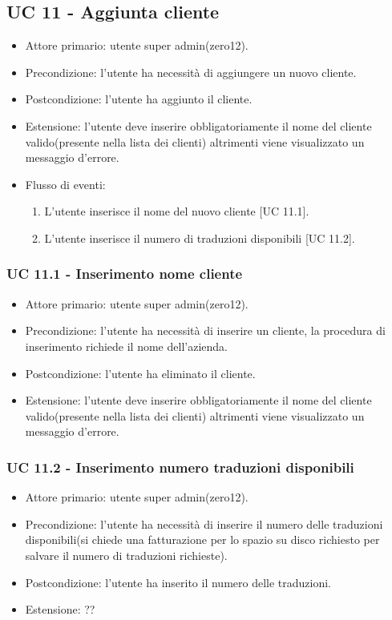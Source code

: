 \subsection*{UC 11 - Aggiunta cliente}
    \begin{itemize}
        \item Attore primario: utente super admin(zero12).
        \item Precondizione: l'utente ha necessità di aggiungere un nuovo cliente.
        \item Postcondizione: l'utente ha aggiunto il cliente.
        \item Estensione: l'utente deve inserire obbligatoriamente il nome del cliente valido(presente nella lista dei clienti) altrimenti viene visualizzato un messaggio d'errore.
        \item Flusso di eventi:
        \begin{enumerate}
            \item L'utente inserisce il nome del nuovo cliente [UC 11.1].
            \item L'utente inserisce il numero di traduzioni disponibili [UC 11.2].
        \end{enumerate}
    \end{itemize}
    \subsubsection*{UC 11.1 - Inserimento nome cliente}
        \begin{itemize}
            \item Attore primario: utente super admin(zero12).
            \item Precondizione: l'utente ha necessità di inserire un cliente, la procedura di inserimento richiede il nome dell'azienda.
            \item Postcondizione: l'utente ha eliminato il cliente.
            \item Estensione: l'utente deve inserire obbligatoriamente il nome del cliente valido(presente nella lista dei clienti) altrimenti viene visualizzato un messaggio d'errore.
        \end{itemize}
    \subsubsection*{UC 11.2 - Inserimento numero traduzioni disponibili}
        \begin{itemize}
            \item Attore primario: utente super admin(zero12).
            \item Precondizione: l'utente ha necessità di inserire il numero delle traduzioni disponibili(si chiede una fatturazione per lo spazio su disco richiesto per salvare il numero di traduzioni richieste).
            \item Postcondizione: l'utente ha inserito il numero delle traduzioni.
            \item Estensione: ??
        \end{itemize}
